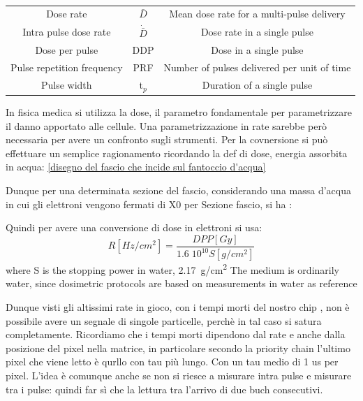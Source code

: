 \begin{table}
   \begin{center}
   \begin{tabular}{| c | c | c |}
   \hline
   \\
   \hline
   \hline
Dose rate & $\bar{D}$ & Mean dose rate for a multi-pulse delivery\\
Intra pulse dose rate & $\Dot{\bar{D}}$ & Dose rate in a single pulse \\
Dose per pulse & DDP & Dose in a single pulse \\
Pulse repetition frequency & PRF & Number of pulses delivered per unit of time\\
Pulse width & t$_{p}$ & Duration of a single pulse\\
   \hline
   \end{tabular}
   \caption{}
   \label{tab:}
   \end{center}
\end{table}    

In fisica medica si utilizza la dose, il parametro fondamentale per parametrizzare il danno apportato alle cellule. Una parametrizzazione in rate sarebbe però necessaria per avere un confronto sugli strumenti. 
Per la covnersione si può effettuare un semplice ragionamento ricordando la def di dose, energia assorbita in acqua: 
\ref{disegno del fascio che incide sul fantoccio d'acqua}

Dunque per una determinata sezione del fascio, considerando una massa d'acqua in cui gli elettroni vengono fermati di X0 per Sezione fascio, si ha :


Quindi per avere una conversione di dose in elettroni si usa:
\begin{equation}
   R[Hz/cm^2] = \frac{DPP[Gy]}{1.6 \;10^{10} S[g/cm^2]}
\end{equation}
where S is the stopping power in water, \SI{2.17}{g/cm\squared}
The medium is ordinarily water, since dosimetric protocols are based on measurements in water as reference


Dunque visti gli altissimi rate in gioco, con i tempi morti del nostro chip , non è possibile avere un segnale di singole particelle, perchè in tal caso si satura completamente. 
Ricordiamo che i tempi morti dipendono dal rate e anche dalla posizione del pixel nella matrice, in particolare secondo la priority chain l'ultimo pixel che viene letto è qurllo con tau più lungo. Con un tau medio di 1 us per pixel. 
L'idea è comunque anche se non si riesce a misurare intra pulse e misurare tra i pulse: quindi far sì che la lettura tra l'arrivo di due buch consecutivi. 

